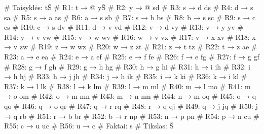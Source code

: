 \begin{pythonaienv}[bc]
# Taisyklės:
tŠ             # R1: t → @
yŠ             # R2: y → @
sd             # R3: s → d
ds             # R4: d → s
sa             # R5: s → a
as             # R6: a → s
sb             # R7: s → b
bs             # R8: b → s
sc             # R9: s → c
cs             # R10: c → s
dv             # R11: d → v
vd             # R12: v → d
vy             # R13: v → y
yv             # R14: y → v
vw             # R15: v → w
wv             # R16: w → v
vx             # R17: v → x
xv             # R18: x → v
zw             # R19: z → w
wz             # R20: w → z
zt             # R21: z → t
tz             # R22: t → z
ae             # R23: a → e
ea             # R24: e → a
ef             # R25: e → f
fe             # R26: f → e
fg             # R27: f → g
gf             # R28: g → f
gh             # R29: g → h
hg             # R30: h → g
hi             # R31: h → i
ih             # R32: i → h
hj             # R33: h → j
jh             # R34: j → h
ik             # R35: i → k
ki             # R36: k → i
kl             # R37: k → l
lk             # R38: l → k
lm             # R39: l → m
ml             # R40: m → l
mo             # R41: m → o
om             # R42: o → m
mn             # R43: m → n
nm             # R44: n → m
oq             # R45: o → q
qo             # R46: q → o
qr             # R47: q → r
rq             # R48: r → q
qj             # R49: q → j
jq             # R50: j → q
rb             # R51: r → b
br             # R52: b → r
np             # R53: n → p
pn             # R54: p → n
cu             # R55: c → u
uc             # R56: u → c
# Faktai:
s
# Tikslas:
Š
\end{pythonaienv}
